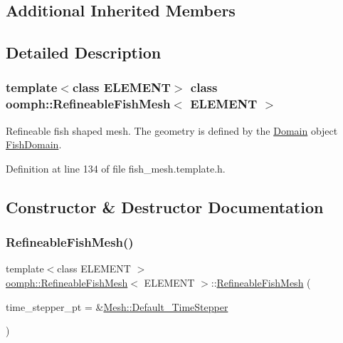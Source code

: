\subsection*{Additional Inherited Members}


\subsection{Detailed Description}
\subsubsection*{template$<$class E\+L\+E\+M\+E\+NT$>$\newline
class oomph\+::\+Refineable\+Fish\+Mesh$<$ E\+L\+E\+M\+E\+N\+T $>$}

Refineable fish shaped mesh. The geometry is defined by the \hyperlink{classoomph_1_1Domain}{Domain} object \hyperlink{classoomph_1_1FishDomain}{Fish\+Domain}. 

Definition at line 134 of file fish\+\_\+mesh.\+template.\+h.



\subsection{Constructor \& Destructor Documentation}
\mbox{\label{classoomph_1_1RefineableFishMesh_a7f31e65306286e83a5d17459bae9163d}} 
\subsubsection{\texorpdfstring{Refineable\+Fish\+Mesh()}{RefineableFishMesh()}\hspace{0.1cm}{\footnotesize\ttfamily [1/2]}}
{\footnotesize\ttfamily template$<$class E\+L\+E\+M\+E\+NT $>$ \\
\hyperlink{classoomph_1_1RefineableFishMesh}{oomph\+::\+Refineable\+Fish\+Mesh}$<$ E\+L\+E\+M\+E\+NT $>$\+::\hyperlink{classoomph_1_1RefineableFishMesh}{Refineable\+Fish\+Mesh} (\begin{DoxyParamCaption}\item[{\hyperlink{classoomph_1_1TimeStepper}{Time\+Stepper} $\ast$}]{time\+\_\+stepper\+\_\+pt = {\ttfamily \&\hyperlink{classoomph_1_1Mesh_a12243d0fee2b1fcee729ee5a4777ea10}{Mesh\+::\+Default\+\_\+\+Time\+Stepper}} }\end{DoxyParamCaption})\hspace{0.3cm}{\ttfamily [inline]}}



